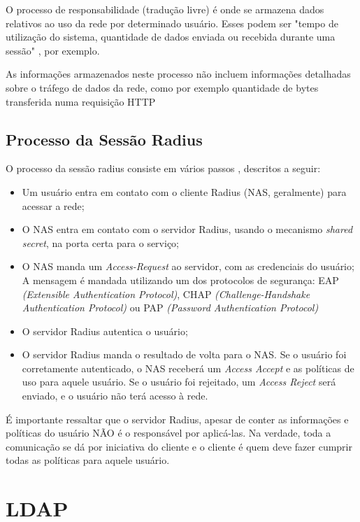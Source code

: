 O processo de responsabilidade (tradução livre) é onde se armazena dados relativos
ao uso da rede por determinado usuário. Esses podem ser "tempo de utilização do sistema,
quantidade de dados enviada ou recebida durante uma sessão" \cite{radius-guide}, por exemplo.

As informações armazenados neste processo não incluem informações detalhadas sobre o tráfego
de dados da rede, como por exemplo quantidade de bytes transferida numa requisição HTTP \cite{radius-guide}

\subsection{Processo da Sessão Radius}

O processo da sessão radius consiste em vários passos \cite{radius-guide}, descritos a seguir:
\begin{itemize}
    \item Um usuário entra em contato com o cliente Radius (NAS, geralmente) para
    acessar a rede;
    \item O NAS entra em contato com o servidor Radius, usando o mecanismo \textit{shared secret},
    na porta certa para o serviço;
    \item O NAS manda um \textit{Access-Request} ao servidor, com as credenciais
    do usuário;
        \subitem A mensagem é mandada utilizando um dos protocolos de segurança:
        EAP \textit{(Extensible Authentication Protocol)},
        CHAP \textit{(Challenge-Handshake Authentication Protocol)} ou
        PAP \textit{(Password Authentication Protocol)}
    \item O servidor Radius autentica o usuário;
    \item O servidor Radius manda o resultado de volta para o NAS. Se o usuário foi
    corretamente autenticado, o NAS receberá um \textit{Access Accept} e as políticas
    de uso para aquele usuário. Se o usuário foi rejeitado, um \textit{Access Reject}
    será enviado, e o usuário não terá acesso à rede.
\end{itemize}

É importante ressaltar que o servidor Radius, apesar de conter as informações e políticas
do usuário NÃO é o responsável por aplicá-las. Na verdade, toda a comunicação se dá por
iniciativa do cliente e o cliente é quem deve fazer cumprir todas as políticas para aquele usuário.

\section{LDAP}

